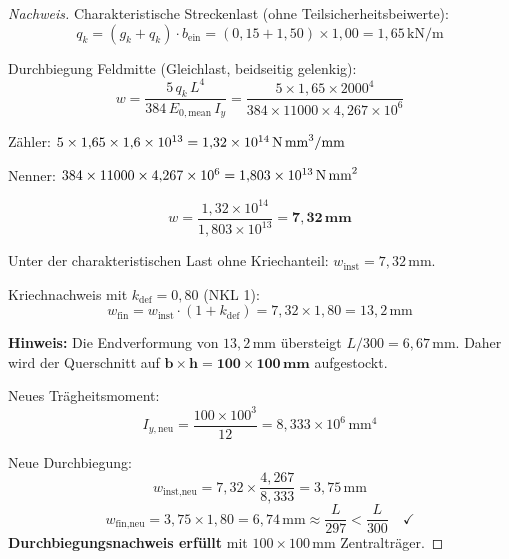 ﻿\documentclass[12pt,a4paper]{article}
\theoremstyle{definition}
\theoremstyle{plain}
\theoremstyle{remark}
\begin{document}
\begin{proof}[Nachweis]
Charakteristische Streckenlast (ohne Teilsicherheitsbeiwerte):
\begin{equation*}
  q_k = (g_k + q_k) \cdot b_{\text{ein}} = (0{,}15 + 1{,}50) \times 1{,}00
      = 1{,}65\,\text{kN/m}
\end{equation*}

Durchbiegung Feldmitte (Gleichlast, beidseitig gelenkig):
\begin{equation*}
  w = \frac{5\,q_k\,L^4}{384\,E_{0,\text{mean}}\,I_y}
    = \frac{5 \times 1{,}65 \times 2000^4}{384 \times 11000 \times 4{,}267 \times 10^6}
\end{equation*}

Zähler: $5 \times 1{,}65 \times 1{,}6 \times 10^{13} = 1{,}32 \times 10^{14}\,\text{N\,mm}^3/\text{mm}$

Nenner: $384 \times 11000 \times 4{,}267 \times 10^6 = 1{,}803 \times 10^{13}\,\text{N\,mm}^2$

\begin{equation*}
  w = \frac{1{,}32 \times 10^{14}}{1{,}803 \times 10^{13}} = \mathbf{7{,}32\,\text{mm}}
\end{equation*}

Unter der charakteristischen Last ohne Kriechanteil:
$w_{\text{inst}} = 7{,}32\,\text{mm}$.

\medskip
Kriechnachweis mit $k_{\text{def}} = 0{,}80$ (NKL 1):
\begin{equation*}
  w_{\text{fin}} = w_{\text{inst}} \cdot (1 + k_{\text{def}})
  = 7{,}32 \times 1{,}80 = 13{,}2\,\text{mm}
\end{equation*}

\medskip
\textbf{Hinweis:} Die Endverformung von $13{,}2\,\text{mm}$ übersteigt $L/300 = 6{,}67\,\text{mm}$.
Daher wird der Querschnitt auf $\mathbf{b \times h = 100 \times 100\,\text{mm}}$ aufgestockt.

\medskip
Neues Trägheitsmoment:
\begin{equation*}
  I_{y,\text{neu}} = \frac{100 \times 100^3}{12} = 8{,}333 \times 10^6\,\text{mm}^4
\end{equation*}

Neue Durchbiegung:
\begin{equation*}
  w_{\text{inst,neu}} = 7{,}32 \times \frac{4{,}267}{8{,}333} = 3{,}75\,\text{mm}
\end{equation*}
\begin{equation*}
  w_{\text{fin,neu}} = 3{,}75 \times 1{,}80 = 6{,}74\,\text{mm} \approx \frac{L}{297} < \frac{L}{300} \quad \checkmark
\end{equation*}
\textbf{Durchbiegungsnachweis erfüllt} mit $100 \times 100\,\text{mm}$ Zentralträger.
\end{proof}
\end{document}
